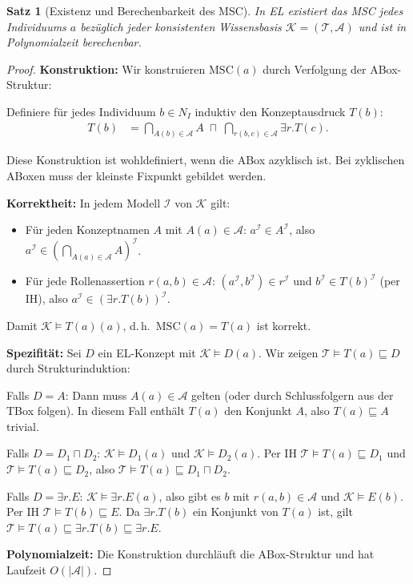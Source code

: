 ﻿\documentclass[a4paper,12pt]{article}
\theoremstyle{definition}
\theoremstyle{plain}
\newtheorem{satz}{Satz}[section]
\theoremstyle{remark}
\newcommand{\Tbox}{\ensuremath{\mathcal{T}}}
\newcommand{\Abox}{\ensuremath{\mathcal{A}}}
\newcommand{\KB}{\ensuremath{\mathcal{K}}}
\newcommand{\interp}[1]{\ensuremath{\mathcal{#1}}}
\begin{document}
\begin{satz}[Existenz und Berechenbarkeit des MSC]
\label{satz:msc-exist}
In \textsf{EL} existiert das MSC jedes Individuums $a$
bez{\"{u}}glich jeder konsistenten Wissensbasis $\KB = (\Tbox, \Abox)$
und ist in Polynomialzeit berechenbar.
\end{satz}

\begin{proof}
\textbf{Konstruktion:}
Wir konstruieren $\mathrm{MSC}(a)$ durch Verfolgung der
ABox-Struktur:

Definiere f{\"{u}}r jedes Individuum $b \in N_I$ induktiv
den Konzeptausdruck $T(b)$:
\begin{align*}
  T(b) &= \bigcap_{A(b) \in \Abox} A
          \;\sqcap\;
          \bigcap_{r(b,c) \in \Abox} \exists r.T(c).
\end{align*}

Diese Konstruktion ist wohldefiniert, wenn die ABox azyklisch ist.
Bei zyklischen ABoxen muss der kleinste Fixpunkt gebildet werden.

\textbf{Korrektheit:}
In jedem Modell $\interp{I}$ von $\KB$ gilt:
\begin{itemize}
  \item F{\"{u}}r jeden Konzeptnamen $A$ mit $A(a) \in \Abox$:
        $a^\interp{I} \in A^\interp{I}$, also
        $a^\interp{I} \in (\bigcap_{A(a) \in \Abox} A)^\interp{I}$.
  \item F{\"{u}}r jede Rollenassertion $r(a,b) \in \Abox$:
        $(a^\interp{I}, b^\interp{I}) \in r^\interp{I}$
        und $b^\interp{I} \in T(b)^\interp{I}$ (per IH),
        also $a^\interp{I} \in (\exists r.T(b))^\interp{I}$.
\end{itemize}
Damit $\KB \models T(a)(a)$, d.\,h.\ $\mathrm{MSC}(a) = T(a)$
ist korrekt.

\textbf{Spezifit{\"{a}}t:}
Sei $D$ ein \textsf{EL}-Konzept mit $\KB \models D(a)$.
Wir zeigen $\Tbox \models T(a) \sqsubseteq D$ durch
Strukturinduktion:

Falls $D = A$: Dann muss $A(a) \in \Abox$ gelten
(oder durch Schlussfolgern aus der TBox folgen).
In diesem Fall enth{\"{a}}lt $T(a)$ den Konjunkt $A$,
also $T(a) \sqsubseteq A$ trivial.

Falls $D = D_1 \sqcap D_2$:
$\KB \models D_1(a)$ und $\KB \models D_2(a)$.
Per IH $\Tbox \models T(a) \sqsubseteq D_1$
und $\Tbox \models T(a) \sqsubseteq D_2$,
also $\Tbox \models T(a) \sqsubseteq D_1 \sqcap D_2$.

Falls $D = \exists r.E$:
$\KB \models \exists r.E(a)$, also gibt es $b$
mit $r(a,b) \in \Abox$ und $\KB \models E(b)$.
Per IH $\Tbox \models T(b) \sqsubseteq E$.
Da $\exists r.T(b)$ ein Konjunkt von $T(a)$ ist,
gilt $\Tbox \models T(a) \sqsubseteq \exists r.T(b) \sqsubseteq \exists r.E$.

\textbf{Polynomialzeit:}
Die Konstruktion durchl{\"{a}}uft die ABox-Struktur und hat
Laufzeit $O(|\Abox|)$.
\qedhere
\end{proof}
\end{document}
